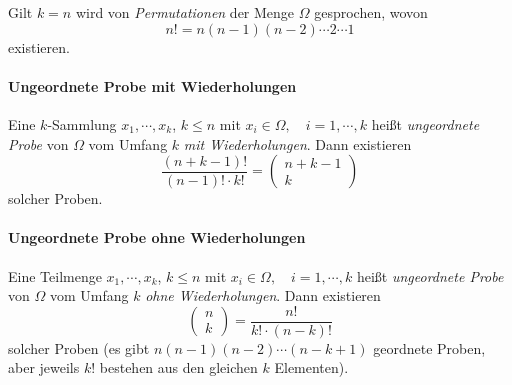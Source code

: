 \documentclass[a4paper, 11pt, accentcolor = tud3b]{tudreport}
\begin{document}
                        Gilt \(k = n\) wird von \textit{Permutationen} der Menge \(\Omega\) gesprochen, wovon
                        \begin{equation*}
	                        n! = n(n - 1)(n - 2) \cdots 2 \cdots 1
                        \end{equation*}
                        existieren.

                    \paragraph{Ungeordnete Probe mit Wiederholungen}
	                    Eine \(k\)-Sammlung \( x_1, \cdots, x_k \), \( k \leq n \) mit \( x_i \in \Omega, \quad i = 1, \cdots, k \) heißt \textit{ungeordnete Probe} von \(\Omega\) vom Umfang \(k\) \textit{mit Wiederholungen}. Dann existieren
                        \begin{equation*}
	                        \frac{(n + k - 1)!}{(n - 1)! \cdot k!} =
	                        \begin{pmatrix}
		                        n + k - 1 \\
		                        k
	                        \end{pmatrix}
                        \end{equation*}
                        solcher Proben.

                    \paragraph{Ungeordnete Probe ohne Wiederholungen}
                        Eine Teilmenge \( x_1, \cdots, x_k \), \( k \leq n \) mit \( x_i \in \Omega, \quad i = 1, \cdots, k \) heißt \textit{ungeordnete Probe} von \(\Omega\) vom Umfang \(k\) \textit{ohne Wiederholungen}. Dann existieren
                        \begin{equation*}
	                        \begin{pmatrix}
		                        n \\
		                        k
	                        \end{pmatrix}
	                        =
	                        \frac{n!}{k! \cdot (n - k)!}
                        \end{equation*}
                        solcher Proben (es gibt \( n(n - 1)(n - 2) \cdots (n - k + 1) \) geordnete Proben, aber jeweils \(k!\) bestehen aus den gleichen \(k\) Elementen).
                
\end{document}
